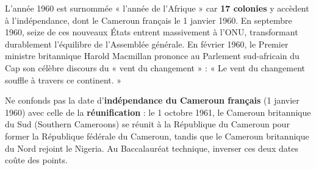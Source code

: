 \documentclass[11pt]{article}
\newcommand{\cle}[1]{{\popxbold\color{popdark}#1}}
\begin{document}
\begin{savaistu}
L'année \cle{1960} est surnommée « l'année de l'Afrique » car \textbf{17 colonies} y accèdent à l'indépendance, dont le Cameroun français le 1\ier{} janvier 1960. En septembre 1960, seize de ces nouveaux États entrent massivement à l'ONU, transformant durablement l'équilibre de l'Assemblée générale. En février 1960, le Premier ministre britannique Harold Macmillan prononce au Parlement sud-africain du Cap son célèbre discours du « vent du changement » : « Le vent du changement souffle à travers ce continent. »
\end{savaistu}

\begin{attention}
Ne confonds pas la date d'\textbf{indépendance du Cameroun français} (\cle{1\ier{} janvier 1960}) avec celle de la \textbf{réunification} : le 1\ier{} octobre 1961, le Cameroun britannique du Sud (Southern Cameroons) se réunit à la République du Cameroun pour former la République fédérale du Cameroun, tandis que le Cameroun britannique du Nord rejoint le Nigeria. Au Baccalauréat technique, inverser ces deux dates coûte des points.
\end{attention}
\end{document}
